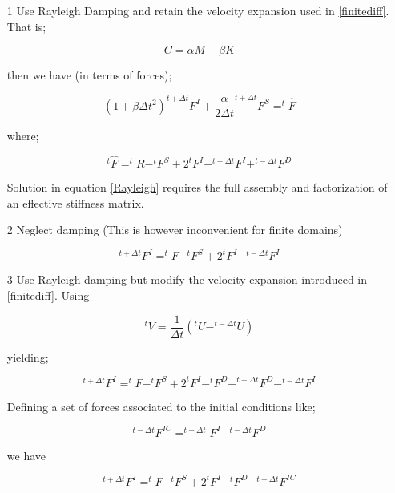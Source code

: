 \begin{itemize}
\item[1] Use Rayleigh Damping and retain the velocity expansion used in \eqref{finitediff}. That is;

\begin{equation}
C=\alpha M+\beta K
\end{equation}

then we have (in terms of forces);

\begin{equation}
(1+\beta \Delta t^2) ^{t+\Delta t}F^I+\dfrac{\alpha}{2\Delta t} ^{t+\Delta t}F^S=^{t}\hat{F}
\label{Rayleigh}
\end{equation}

where;

\[
^{t}\hat{F}=^{t}R-^{t}F^S+2 ^{t}F^I-^{t-\Delta t}F^I+^{t-\Delta t}F^D
\]

Solution in equation \eqref{Rayleigh} requires the full assembly and factorization of an effective stiffness matrix.

\item[2] Neglect damping (This is however inconvenient for finite domains) 


\begin{equation}
^{t+\Delta t}F^I=^{t}F-^{t}F^S+2 ^{t}F^I-^{t-\Delta t}F^I
\label{Nodamping}
\end{equation}

\item[3] Use Rayleigh damping but modify the velocity expansion introduced in \eqref{finitediff}. Using

\begin{equation}
^{t}V=\dfrac{1}{\Delta t}(^{t}U-^{t-\Delta t}U)
\label{velocity}
\end{equation}

yielding;

\begin{equation}
^{t+\Delta t}F^I=^{t}F-^{t}F^S+2 ^{t}F^{I}-^{t}F^D+^{t-\Delta t}F^D-^{t-\Delta t}F^I
\end{equation}

Defining a set of forces associated to the initial conditions like;

\[
^{t-\Delta t}F^{IC}=^{t-\Delta t}F^I-^{t-\Delta t}F^D
\]

we have

\begin{equation}
^{t+\Delta t}F^I=^{t}F-^{t}F^S+2 ^{t}F^{I}-^{t}F^D-^{t-\Delta t}F^{IC}
\label{modvelocity}
\end{equation}

\end{itemize}

